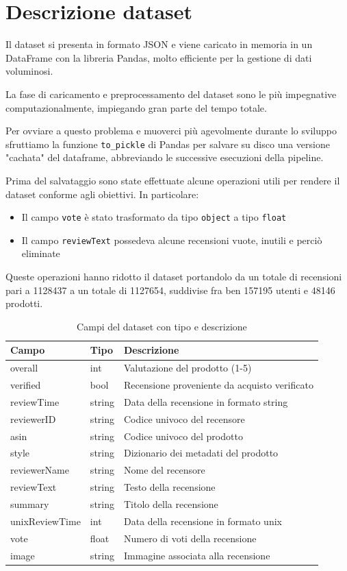 \section{Descrizione dataset}
\label{descrizione_dataset}
Il dataset si presenta in formato JSON e viene caricato in memoria in un DataFrame con la libreria Pandas, molto efficiente per la gestione di dati voluminosi. 

La fase di caricamento e preprocessamento del dataset sono le più impegnative computazionalmente, impiegando gran parte del tempo totale.

Per ovviare a questo problema e muoverci più agevolmente durante lo sviluppo sfruttiamo la funzione \texttt{to\_pickle} di Pandas per salvare su disco una versione "cachata" del dataframe, abbreviando le successive esecuzioni della pipeline.

\par
Prima del salvataggio sono state effettuate alcune operazioni utili per rendere il dataset conforme agli obiettivi. In particolare:
\begin{itemize}
    \item Il campo \texttt{vote} è stato trasformato da tipo \texttt{object} a tipo \texttt{float}
    \item Il campo \texttt{reviewText} possedeva alcune recensioni vuote, inutili e perciò eliminate
\end{itemize}
Queste operazioni hanno ridotto il dataset portandolo da un totale di recensioni pari a 1128437 a un totale di 1127654, suddivise fra ben 157195 utenti e 48146 prodotti.
\begin{table}[H]
\small  
\centering
\begin{tabular}{|p{}||p{}||p{}|}
\hline
Campo & Tipo & Descrizione  \\
\hline
overall & int & Valutazione del prodotto (1-5)\\
verified & bool & Recensione proveniente da acquisto verificato\\
reviewTime & string & Data della recensione in formato string\\
reviewerID & string & Codice univoco del recensore\\
asin & string & Codice univoco del prodotto\\
style & string & Dizionario dei metadati del prodotto\\
reviewerName & string & Nome del recensore\\
reviewText & string & Testo della recensione\\
summary & string & Titolo della recensione\\
unixReviewTime & int & Data della recensione in formato unix\\
vote & float & Numero di voti della recensione \\
image & string & Immagine associata alla recensione\\
\hline
\end{tabular}
\caption{Campi del dataset con tipo e descrizione}
\label{table_dataset_description}
\end{table}

